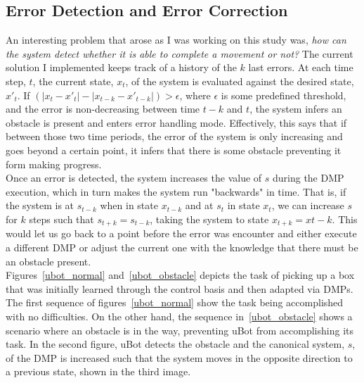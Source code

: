 \documentclass[a4paper]{article}
\begin{document}
\subsection{Error Detection and Error Correction} 
\indent \indent An interesting problem that arose as I was working on this study was, \textit{how can the system detect whether it is able to complete a movement or not?} The current solution I implemented keeps track of a history of the $k$ last errors. At each time step, $t$, the current state, $x_t$, of the system is evaluated against the desired state, $x'_t$. If $(|x_t - x'_t| - |x_{t-k} - x'_{t-k}|) > \epsilon$, where $\epsilon$ is some predefined threshold, and the error is non-decreasing between time $t-k$ and $t$, the system infers an obstacle is present and enters error handling mode. Effectively, this says that if between those two time periods, the error of the system is only increasing and goes beyond a certain point, it infers that there is some obstacle preventing it form making progress. \\
\indent Once an error is detected, the system increases the value of $s$ during the DMP execution, which in turn makes the system run "backwards" in time. That is, if the system is at $s_{t-k}$ when in state $x_{t-k}$ and at $s_t$ in state $x_t$, we can increase $s$ for $k$ steps such that $s_{t+k} = s_{t-k}$, taking the system to state $x_{t+k} = x{t-k}$. This would let us go back to a point before the error was encounter and either execute a different DMP or adjust the current one with the knowledge that there must be an obstacle present. \\ 
\indent Figures~\ref{ubot_normal} and~\ref{ubot_obstacle} depicts the task of picking up a box that was initially learned through the control basis and then adapted via DMPs. The first sequence of figures~\ref{ubot_normal} show the task being accomplished with no difficulties. On the other hand, the sequence in~\ref{ubot_obstacle} shows a scenario where an obstacle is in the way, preventing uBot from accomplishing its task. In the second figure, uBot detects the obstacle and the canonical system, $s$, of the DMP is increased such that the system moves in the opposite direction to a previous state, shown in the third image. 
\end{document}
